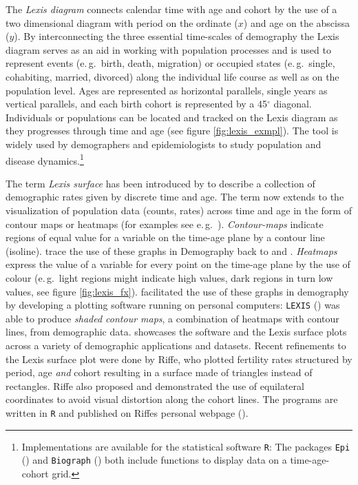 \documentclass{scrartcl}
\begin{document}
The \emph{Lexis diagram} connects calendar time with age and cohort by the use of a two dimensional diagram with period on the ordinate ($x$) and age on the abscissa ($y$). By interconnecting the three essential time-scales of demography the Lexis diagram serves as an aid in working with population processes and is used to represent events (e.\,g.~birth, death, migration) or occupied states (e.\,g.~single, cohabiting, married, divorced) along the individual life course as well as on the population level. Ages are represented as horizontal parallels, single years as vertical parallels, and each birth cohort is represented by a 45$^\circ$ diagonal. Individuals or populations can be located and tracked on the Lexis diagram as they progresses through time and age (see figure \ref{fig:lexis_exmpl}). The tool is widely used by demographers and epidemiologists to study population and disease dynamics.\footnote{Implementations are available for the statistical software \texttt{R}: The packages \texttt{Epi} (\cite{Carstensen2014}) and \texttt{Biograph} (\cite{Willekens2013b}) both include functions to display data on a time-age-cohort grid.}

The term \emph{Lexis surface} has been introduced by \textcite{Arthur1984} to describe a collection of demographic rates given by discrete time and age. The term now extends to the visualization of population data (counts, rates) across time and age in the form of contour maps or heatmaps (for examples see e.\,g.~\cite{Rau2008, Scherbov2002}). \emph{Contour-maps} indicate regions of equal value for a variable on the time-age plane by a contour line (isoline). \textcite{Vaupel1987} trace the use of these graphs in Demography back to \textcite{Kermack1934} and \textcite{Delaporte1941}. \emph{Heatmaps} express the value of a variable for every point on the time-age plane by the use of colour (e.\,g.~light regions might indicate high values, dark regions in turn low values, see figure \ref{fig:lexis_fx}). \citeauthor{Gambill1985} facilitated the use of these graphs in demography by developing a plotting software running on personal computers: \texttt{LEXIS} (\cite{Gambill1985}) was able to produce \emph{shaded contour maps}, a combination of heatmaps with contour lines, from demographic data.  showcases the software and the Lexis surface plots across a variety of demographic applications and datasets. Recent refinements to the Lexis surface plot were done by Riffe, who plotted fertility rates structured by period, age \emph{and} cohort resulting in a surface made of triangles instead of rectangles. Riffe also proposed and demonstrated the use of equilateral coordinates to avoid visual distortion along the cohort lines. The programs are written in \texttt{R} and published on Riffes personal webpage (\cite{Riffe2014}).
\end{document}
